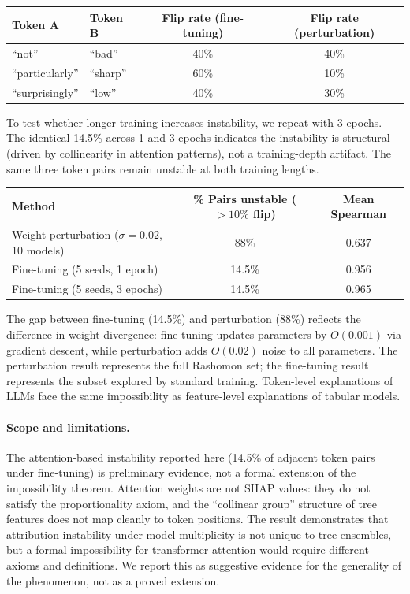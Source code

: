 \documentclass{article}
\begin{document}
\begin{center}
\small
\begin{tabular}{@{}llcc@{}}
\toprule
Token A & Token B & Flip rate (fine-tuning) & Flip rate (perturbation) \\
\midrule
``not'' & ``bad'' & 40\% & 40\% \\
``particularly'' & ``sharp'' & 60\% & 10\% \\
``surprisingly'' & ``low'' & 40\% & 30\% \\
\bottomrule
\end{tabular}
\end{center}

To test whether longer training increases instability, we repeat with 3 epochs. The identical 14.5\% across 1 and 3 epochs indicates the instability is structural (driven by collinearity in attention patterns), not a training-depth artifact. The same three token pairs remain unstable at both training lengths.

\begin{center}
\small
\begin{tabular}{@{}lcc@{}}
\toprule
Method & \% Pairs unstable ($>10\%$ flip) & Mean Spearman \\
\midrule
Weight perturbation ($\sigma{=}0.02$, 10 models) & 88\% & 0.637 \\
Fine-tuning (5 seeds, 1 epoch) & 14.5\% & 0.956 \\
Fine-tuning (5 seeds, 3 epochs) & 14.5\% & 0.965 \\
\bottomrule
\end{tabular}
\end{center}

The gap between fine-tuning (14.5\%) and perturbation (88\%) reflects the difference in weight divergence: fine-tuning updates parameters by $O(0.001)$ via gradient descent, while perturbation adds $O(0.02)$ noise to all parameters. The perturbation result represents the full Rashomon set; the fine-tuning result represents the subset explored by standard training. Token-level explanations of LLMs face the same impossibility as feature-level explanations of tabular models.

\paragraph{Scope and limitations.}
The attention-based instability reported here (14.5\% of adjacent token pairs under fine-tuning) is preliminary evidence, not a formal extension of the impossibility theorem. Attention weights are not SHAP values: they do not satisfy the proportionality axiom, and the ``collinear group'' structure of tree features does not map cleanly to token positions. The result demonstrates that attribution instability under model multiplicity is not unique to tree ensembles, but a formal impossibility for transformer attention would require different axioms and definitions. We report this as suggestive evidence for the generality of the phenomenon, not as a proved extension.
\end{document}
